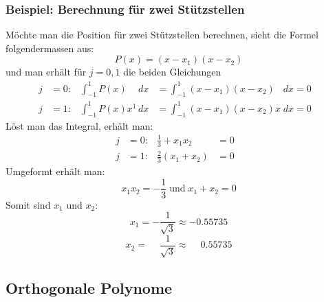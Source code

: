\subsubsection{Beispiel: Berechnung für zwei Stützstellen}
Möchte man die Position für zwei Stützstellen berechnen, sieht die Formel folgendermassen aus:
\begin{equation}
    P(x) = (x - x_{1})(x - x_{2})
\end{equation}
und man erhält für $j = 0,1$ die beiden Gleichungen
\begin{align}
    j &= 0: & \int_{-1}^{1}P(x)\phantom{x^{1}}\,dx  &= \int_{-1}^{1}(x - x_{1})(x - x_{2})\phantom{x} \; dx = 0 & \\
    j &= 1: & \int_{-1}^{1}P(x)x^{1}\,dx            &= \int_{-1}^{1}(x - x_{1})(x - x_{2})x \; dx = 0 &
\end{align}
Löst man das Integral, erhält man:
\begin{align}
    j  &= 0: & \frac{1}{3} + x_{1}x_{2} &= 0 & \\
    j  &= 1: & \frac{2}{3}(x_{1}+x_{2}) &= 0 &
\end{align}
Umgeformt erhält man:
\begin{equation}
    x_{1}x_{2} = -\frac{1}{3}
    \;
    \text{und}
    \;
    x_{1}+x_{2} = 0
\end{equation}
Somit sind $ x_{1} $ und $ x_{2} $:
\begin{equation*}
    x_{1} = -\frac{1}{\sqrt{3}} \approx -0.55735
\end{equation*}
\begin{equation}
    x_{2} = \phantom{-} \frac{1}{\sqrt{3}} \approx \phantom{-}0.55735
\end{equation}

\subsection{Orthogonale Polynome
\label{quadratur:subsection:orthogonalepolynome}}

